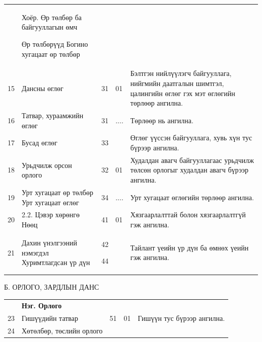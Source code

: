 {{{{{\begin{tabular}{ |p{0.5cm}||p{5cm}|p{1cm}|p{1cm}|p{4.2cm} | }
	
	
	\hline
	
	\hline
	
	&        Хоёр. Өр төлбөр ба байгууллагын өмч
	
	
	Өр төлбөрүүд
	Богино хугацаат өр төлбөр
	
	& &  & \\
	15  &Дансны өглөг   &31&   01 &Бэлтгэн нийлүүлэгч байгууллага, нийгмийн даатгалын шимтгэл, цалингийн өглөг гэх мэт өглөгийн төрлөөр ангилна.\\
	
	16& Татвар, хураамжийн өглөг
	
	
	& 31   &.... &Төрлөөр нь ангилна. \\
	17 &Бусад өглөг
	& 33&   &Өглөг үүссэн байгууллага, хувь хүн тус бүрээр ангилна. \\
	
	18 &Урьдчилж орсон орлого
	
	& 32&  01 &Худалдан авагч байгууллагаас урьдчилж төлсөн орлогыг худалдан авагч бүрээр ангилна.\\
	\hline
	
	19&  Урт хугацаат өр төлбөр
	Урт хугацаат өглөг
	
	
	& 34   &.... &Урт хугацаат өглөгийн төрлөөр ангилна. \\
	\hline
	20& 2.2. Цэвэр хөрөнгө
	Нөөц
	
	
	
	& 41   &01 &Хязгаарлалттай болон хязгаарлалтгүй гэж ангилна. \\
	
	21& Дахин үнэлгээний нэмэгдэл
	Хуримтлагдсан үр дүн
	
	
	
	
	& 42 
	
	44   & & Тайлант үеийн үр дүн ба өмнөх үеийн гэж ангилна. \\
	\hline
\end{tabular}

\vspace{3.6in}
\begin{center}
	Б. ОРЛОГО, ЗАРДЛЫН ДАНС
\end{center}




\begin{tabular}{ |p{0.5cm}||p{5cm}|p{1cm}|p{1cm}|p{4.2cm} | }
	
	\hline
	&          
	\textbf{Нэг. Орлого}
	
	
	
	& &  & \\
	23   & Гишүүдийн татвар     &51&   01 &Гишүүн тус бүрээр ангилна. \\
	24& Хөтөлбөр, төслийн орлого 
	

\end{tabular}}}}}}
